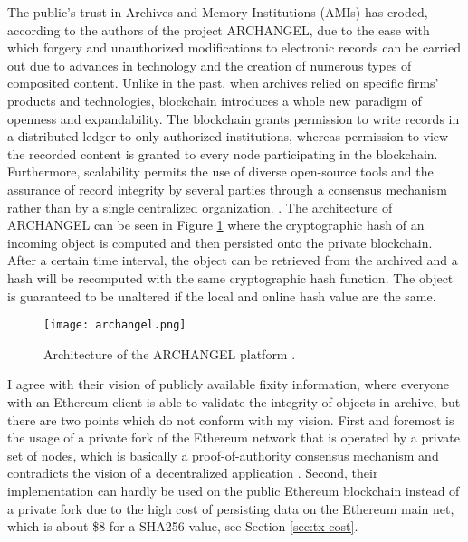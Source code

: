The public's trust in Archives and Memory Institutions (AMIs) has eroded, according to the authors of the project ARCHANGEL, due to the ease with which forgery and unauthorized modifications to electronic records can be carried out due to advances in technology and the creation of numerous types of composited content. Unlike in the past, when archives relied on specific firms' products and technologies, blockchain introduces a whole new paradigm of openness and expandability. The blockchain grants permission to write records in a distributed ledger to only authorized institutions, whereas permission to view the recorded content is granted to every node participating in the blockchain. Furthermore, scalability permits the use of diverse open-source tools and the assurance of record integrity by several parties through a consensus mechanism rather than by a single centralized organization. \cite[4]{wang2021research}.
The architecture of ARCHANGEL can be seen in Figure \ref{fig:archangel} where the cryptographic hash of an incoming object is computed and then persisted onto the private blockchain. After a certain time interval, the object can be retrieved from the archived and a hash will be recomputed with the same cryptographic hash function. The object is guaranteed to be unaltered if the local and online hash value are the same.
\begin{figure}[t]
    \centering
    \texttt{[image: archangel.png]}
    \caption{Architecture of the ARCHANGEL platform \cite[2]{collomosse2018archangel}.}
    \label{fig:archangel}
\end{figure}
I agree with their vision of publicly available fixity information, where everyone with an Ethereum client is able to validate the integrity of objects in archive, but there are two points which do not conform with my vision. First and foremost is the usage of a private fork of the Ethereum network that is operated by a private set of nodes, which is basically a proof-of-authority consensus mechanism and contradicts the vision of a decentralized application \cite[3]{collomosse2018archangel}. Second, their implementation can hardly be used on the public Ethereum blockchain instead of a private fork due to the high cost of persisting data on the Ethereum main net, which is about \$8 for a SHA256 value, see Section \ref{sec:tx-cost}. 

